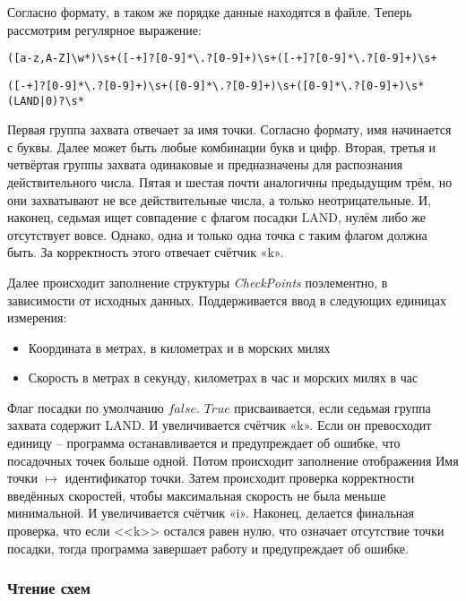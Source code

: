 \documentclass[12pt, a4 paper]{article}
\theoremstyle{plain}
\begin{document}
Согласно формату, в таком же порядке данные находятся в файле. Теперь рассмотрим регулярное выражение:

\begin{verbatim}
([a-z,A-Z]\w*)\s+([-+]?[0-9]*\.?[0-9]+)\s+([-+]?[0-9]*\.?[0-9]+)\s+
\end{verbatim}

\begin{verbatim}
([-+]?[0-9]*\.?[0-9]+)\s+([0-9]*\.?[0-9]+)\s+([0-9]*\.?[0-9]+)\s*(LAND|0)?\s*
\end{verbatim}

Первая группа захвата отвечает за имя точки. Согласно формату, имя начинается с буквы. Далее может быть любые комбинации букв и цифр.
Вторая, третья и четвёртая группы захвата одинаковые и предназначены для распознания действительного числа.
Пятая и шестая почти аналогичны предыдущим трём, но они захватывают не все действительные числа, а только неотрицательные.
И, наконец, седьмая ищет совпадение с флагом посадки LAND, нулём либо же отсутствует вовсе. Однако, одна и только одна точка с таким флагом должна быть. За корректность этого отвечает счётчик «k».

Далее происходит заполнение структуры \textit{CheckPoints} поэлементно, в зависимости от исходных данных. Поддерживается ввод в следующих единицах измерения: 
\begin{itemize}
	\item Координата в метрах, в километрах и в морских милях
	\item Скорость в метрах в секунду, километрах в час и морских милях в час
\end{itemize}

Флаг посадки по умолчанию $false$. $True$ присваивается, если седьмая группа захвата содержит LAND. И увеличивается счётчик «k». Если он превосходит единицу – программа останавливается и предупреждает об ошибке, что посадочных точек больше одной. Потом происходит заполнение отображения Имя точки $\mapsto$ идентификатор точки.
Затем происходит проверка корректности введённых скоростей, чтобы максимальная скорость не была меньше минимальной. И увеличивается счётчик «i».
Наконец, делается финальная проверка, что если <<k>> остался равен нулю, что означает отсутствие точки посадки, тогда программа завершает работу и предупреждает об ошибке.




\subsubsection*{Чтение схем}
\end{document}
